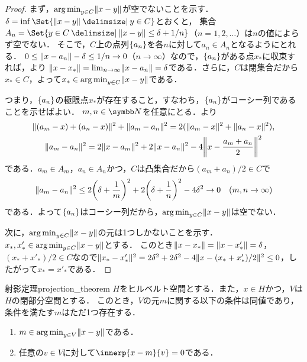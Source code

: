 \documentclass[../../main]{subfiles}
\begin{document}
\begin{proof}
  まず，\(\operatorname*{arg\,min}_{y\in C}\lVert x-y\rVert\)が空でないことを示す．\(\delta=\inf\Set{\vnorm{x-y}\given y\in C}\)とおくと，
  集合\(A_n=\Set{y\in C\given\vnorm{x-y}\leq\delta+1/n}\)（\(n=1,2,\dotsc\)）は\(n\)の値によらず空でない．
  そこで，\(C\)上の点列\(\lbrace a_n\rbrace\)を各\(n\)に対して\(a_n\in A_n\)となるようにとれる．
  \(0\leq\lVert x-a_n\rVert-\delta\leq 1/n\to 0\)（\(n\to\infty\)）なので，\(\lbrace a_n\rbrace\)がある点\(x_{\mathord{\ast}}\)に収束すれば，より
  \(\lVert x-x_{\mathord{\ast}}\rVert=\lim_{n\to\infty}\lVert x-a_n\rVert=\delta\)である．さらに，\(C\)は閉集合だから\(x_{\mathord{\ast}}\in C\)，よって\(x_{\mathord{\ast}}\in\operatorname*{arg\,min}_{y\in C}\lVert x-y\rVert\)である．

  つまり，\(\lbrace a_n\rbrace\)の極限点\(x_{\mathord{\ast}}\)が存在すること，すなわち，\(\lbrace a_n\rbrace\)がコーシー列であることを示せばよい．
  \(m,n\in\numset{N}\)を任意にとる．より
  \begin{gather*}
    \vnorm{(a_m-x)+(a_n-x)}^2+\vnorm{a_m-a_n}^2 = 2(\vnorm{a_m-x}^2+\vnorm{a_n-x}^2), \\
    \vnorm{a_m-a_n}^2 = 2\vnorm{x-a_m}^2+2\vnorm{x-a_n}^2-4\vnorm*{x-\frac{a_m+a_n}{2}}^2
  \end{gather*}
  である．\(a_m\in A_m\)，\(a_n\in A_n\)かつ，\(C\)は凸集合だから\((a_m+a_n)/2\in C\)で
  \[
    \vnorm{a_m-a_n}^2 \leq 2\pqty*{\delta+\frac{1}{m}}^2+2\pqty*{\delta+\frac{1}{n}}^2-4\delta^2
    \to 0\quad(m,n\to\infty)
  \]
  である．よって\(\lbrace a_n\rbrace\)はコーシー列だから，\(\operatorname*{arg\,min}_{y\in C}\lVert x-y\rVert\)は空でない．

  次に，\(\operatorname*{arg\,min}_{y\in C}\lVert x-y\rVert\)の元は1つしかないことを示す．\(x_{\mathord{\ast}},x'_{\mathord{\ast}}\in\operatorname*{arg\,min}_{y\in C}\lVert x-y\rVert\)とする．
  このとき\(\lVert x-x_{\mathord{\ast}}\rVert=\lVert x-x'_{\mathord{\ast}}\rVert=\delta\)，\((x_{\mathord{\ast}}+x'_{\mathord{\ast}})/2\in C\)なので\(\lVert x_{\mathord{\ast}}-x'_{\mathord{\ast}}\rVert^2=2\delta^2+2\delta^2-4\lVert x-(x_{\mathord{\ast}}+x'_{\mathord{\ast}})/2\rVert^2\leq 0\)，したがって\(x_{\mathord{\ast}}=x'_{\mathord{\ast}}\)である．
\end{proof}

\begin{theorem}{射影定理}{projection_theorem}
  \(H\)をヒルベルト空間とする．また，\(x\in H\)かつ，\(V\)は\(H\)の閉部分空間とする．
  このとき，\(V\)の元\(m\)に関する以下の条件は同値であり，条件を満たす\(m\)はただ1つ存在する．
  \begin{enumerate}
    \item \(m\in\operatorname*{arg\,min}_{y\in V}\lVert x-y\rVert\)である．
    \item 任意の\(v\in V\)に対して\(\innerp{x-m}{v}=0\)である．
  \end{enumerate}
\end{theorem}
\end{document}
